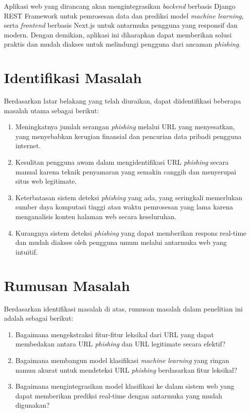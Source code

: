 Aplikasi web yang dirancang akan mengintegrasikan \textit{backend} berbasis Django REST Framework untuk pemrosesan data dan prediksi model \textit{machine learning}, serta \textit{frontend} berbasis Next.js untuk antarmuka pengguna yang responsif dan modern. Dengan demikian, aplikasi ini diharapkan dapat memberikan solusi praktis dan mudah diakses untuk melindungi pengguna dari ancaman \textit{phishing}.

\section{Identifikasi Masalah}

Berdasarkan latar belakang yang telah diuraikan, dapat diidentifikasi beberapa masalah utama sebagai berikut:

\begin{enumerate}
    \item Meningkatnya jumlah serangan \textit{phishing} melalui URL yang menyesatkan, yang menyebabkan kerugian finansial dan pencurian data pribadi pengguna internet.
    
    \item Kesulitan pengguna awam dalam mengidentifikasi URL \textit{phishing} secara manual karena teknik penyamaran yang semakin canggih dan menyerupai situs web legitimate.
    
    \item Keterbatasan sistem deteksi \textit{phishing} yang ada, yang seringkali memerlukan sumber daya komputasi tinggi atau waktu pemrosesan yang lama karena menganalisis konten halaman web secara keseluruhan.
    
    \item Kurangnya sistem deteksi \textit{phishing} yang dapat memberikan respons real-time dan mudah diakses oleh pengguna umum melalui antarmuka web yang intuitif.
\end{enumerate}

\section{Rumusan Masalah}

Berdasarkan identifikasi masalah di atas, rumusan masalah dalam penelitian ini adalah sebagai berikut:

\begin{enumerate}
    \item Bagaimana mengekstraksi fitur-fitur leksikal dari URL yang dapat membedakan antara URL \textit{phishing} dan URL legitimate secara efektif?
    
    \item Bagaimana membangun model klasifikasi \textit{machine learning} yang ringan namun akurat untuk mendeteksi URL \textit{phishing} berdasarkan fitur leksikal?
    
    \item Bagaimana mengintegrasikan model klasifikasi ke dalam sistem web yang dapat memberikan prediksi real-time dengan antarmuka yang mudah digunakan?
\end{enumerate}

